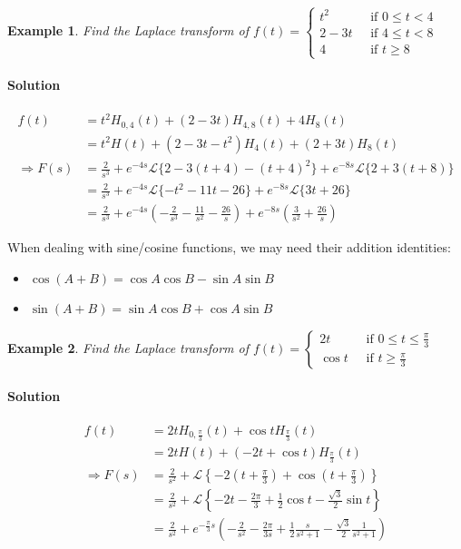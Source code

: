 \documentclass[letterpaper, 11pt, openany]{book}
\theoremstyle{mytheoremstyle}
\theoremstyle{myexamplestyle}
\newtheorem{example}{Example}[section]
\newenvironment{solution}{\paragraph{\sffamily \smaller \fontseries{b}\selectfont Solution}}{\hfill\faSquare}
\begin{document}
\begin{example}
    Find the Laplace transform of \(\displaystyle f(t) = \begin{cases}
        t^2\; &\text{ if } 0 \leq t < 4\\
        2-3t\; &\text{ if }4 \leq t < 8\\
        4\; &\text{ if }t \geq 8
    \end{cases}\)
    \begin{solution}
        \begin{align*}
            f(t) &= t^2 H_{0,4}(t) + (2 -3t) H_{4,8}(t) + 4H_{8}(t)\\
                 &= t^2 H(t) + (2-3t-t^2)H_{4}(t) + (2 + 3t)H_{8}(t)\\
            \Rightarrow F(s) &= \frac{2}{s^{3}} + e^{-4s} \mathcal{L}\{2 - 3(t+4) - (t+4)^2\} + e^{-8s} \mathcal{L}\{2 + 3(t+8)\}\\
                            &= \frac{2}{s^{3}} + e^{-4s} \mathcal{L}\{-t^2-11 t-26\} + e^{-8s} \mathcal{L}\{3t + 26\}\\
                            &= \frac{2}{s^{3}} + e^{-4s} \left(-\frac{2}{s^3} - \frac{11}{s^2} - \frac{26}{s}\right) + e^{-8s}\left(\frac{3}{s^2} + \frac{26}{s}\right)
        \end{align*}
    \end{solution}
\end{example}

When dealing with sine/cosine functions, we may need their addition identities:
\begin{itemize}
    \item \(\cos(A+B) = \cos A \cos B - \sin A \sin B\)
    \item \(\sin(A+B) = \sin A \cos B + \cos A \sin B\)
\end{itemize}

\begin{example}
    Find the Laplace transform of \(\displaystyle f(t) = \begin{cases}
        2t \; &\text{ if }0 \leq t \leq \frac{\pi}{3} \\
        \cos t \; &\text{ if } t \geq \frac{\pi}{3}
    \end{cases}\)
    \begin{solution}
        \begin{align*}
            f(t) &= 2t H_{0,\frac{\pi}{3}}(t) + \cos t H_{\frac{\pi}{3}}(t)\\
                &= 2t H(t) + (-2t + \cos t)H_{\frac{\pi}{3}}(t)\\
            \Rightarrow F(s) &= \frac{2}{s^2} + \mathcal{L}\left\{-2\left(t+\frac{\pi}{3}\right) + \cos \left(t + \frac{\pi}{3}\right)\right\}\\
                            &= \frac{2}{s^2} + \mathcal{L}\left\{-2t -\frac{2\pi}{3} + \frac{1}{2}\cos t - \frac{\sqrt{3}}{2}\sin t\right\}\\
                            &= \frac{2}{s^2} + e^{-\frac{\pi}{3}s} \left(-\frac{2}{s^2} - \frac{2\pi}{3s} + \frac{1}{2}\frac{s}{s^2 + 1} - \frac{\sqrt{3}}{2} \frac{1}{s^2 + 1}\right)
        \end{align*}
    \end{solution}
\end{example}
\end{document}
